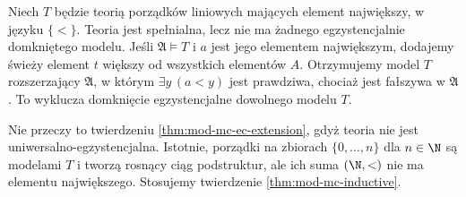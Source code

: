 \begin{przyklad}
\label{ex:mod-mc-no-ec}
Niech $T$ będzie teorią porządków liniowych
mających element największy, w języku $\{<\}$.
Teoria jest spełnialna, lecz nie ma żadnego
egzystencjalnie domkniętego modelu.
Jeśli $\mathfrak A\models T$ i $a$ jest jego
elementem największym, dodajemy świeży element
$t$ większy od wszystkich elementów $A$.
Otrzymujemy model $T$ rozszerzający $\mathfrak A$,
w którym $\exists y\,(a<y)$ jest prawdziwa,
chociaż jest fałszywa w $\mathfrak A$.
To wyklucza domknięcie egzystencjalne dowolnego
modelu $T$.

Nie przeczy to twierdzeniu
\ref{thm:mod-mc-ec-extension}, gdyż teoria nie jest
uniwersalno-egzystencjalna. Istotnie, porządki
na zbiorach $\{0,\ldots,n\}$ dla $n\in\N$
są modelami $T$ i tworzą rosnący ciąg podstruktur,
ale ich suma $(\N,<)$ nie ma elementu największego.
Stosujemy twierdzenie \ref{thm:mod-mc-inductive}.
\end{przyklad}

